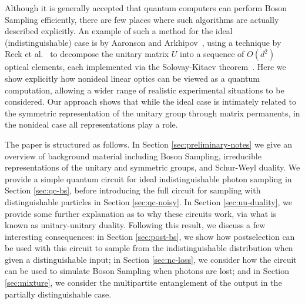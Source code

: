 Although it is generally accepted that quantum computers can perform Boson Sampling efficiently, there are few places where such algorithms are actually described explicitly. 
An example of such a method for the ideal (indistinguishable) case is by Aaronson and Arkhipov~\cite{aaronson2011}, using a technique by Reck et al.~\cite{reck1994} to decompose the unitary matrix $U$ into a sequence of $O(d^2)$ optical elements, each implemented via the Solovay-Kitaev theorem~\cite{nielsen2010}. 
Here we show explicitly how nonideal linear optics can be viewed as a quantum computation, allowing a wider range of realistic experimental situations to be considered.
Our approach shows that while the ideal case is intimately related to the symmetric representation of the unitary group through matrix permanents, in the nonideal case all representations play a role.

The paper is structured as follows. 
In Section \ref{sec:preliminary-notes} we give an overview of background material including Boson Sampling, irreducible representations of the unitary and symmetric groups, and Schur-Weyl duality. 
We provide a simple quantum circuit for ideal indistinguishable photon sampling in Section \ref{sec:qc-bs}, before introducing the full circuit for sampling with distinguishable particles in Section \ref{sec:qc-noisy}. 
In Section \ref{sec:uu-duality}, we provide some further explanation as to why these circuits work, via what is known as unitary-unitary duality.
Following this result, we discuss a few interesting consequences: in Section \ref{sec:post-bs}, we show how postselection can be used with this circuit to sample from the indistinguishable distribution when given a distinguishable input; in Section \ref{sec:nc-loss}, we consider how the circuit can be used to simulate Boson Sampling when photons are lost; and in Section \ref{sec:mixture}, we consider the multipartite entanglement of the output in the partially distinguishable case. 


